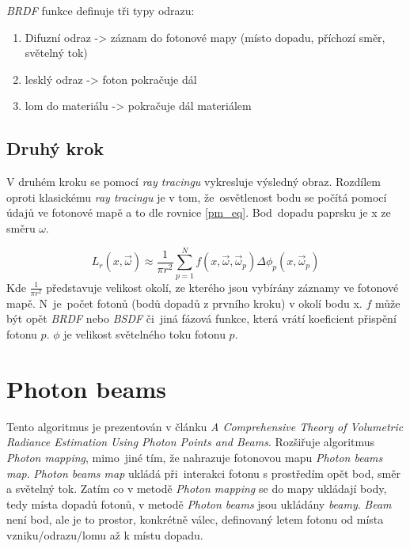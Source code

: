\textit{BRDF} funkce definuje tři typy odrazu:
\begin{enumerate}
   \item Difuzní odraz -> záznam do fotonové mapy (místo dopadu, příchozí směr, světelný tok)
    \item lesklý odraz -> foton pokračuje dál
    \item lom do materiálu -> pokračuje dál materiálem
\end{enumerate}
 
 \subsection{Druhý krok}
V druhém kroku se pomocí \textit{ray tracingu} vykresluje výsledný obraz. Rozdílem oproti klasickému \textit{ray tracingu} je v tom, že~osvětlenost bodu se počítá pomocí údajů ve fotonové mapě a to dle rovnice \ref{pm_eq}. Bod~dopadu paprsku je x ze směru $\omega$.

\begin{equation}\label{pm_eq}
    L_r(x,\vec{\omega}) \approx \frac{1}{\pi r^2} \sum_{p=1}^{N}f(x,\vec{\omega},\vec{\omega}_p)\Delta\phi_p(x,\vec{\omega}_p)
\end{equation}
Kde $\frac{1}{\pi r^2}$ představuje velikost okolí, ze kterého jsou vybírány záznamy ve fotonové mapě. N~je~počet fotonů (bodů dopadů z prvního kroku) v okolí bodu x. $f$ může být opět \textit{BRDF} nebo \textit{BSDF} či~jiná fázová funkce, která vrátí koeficient přispění fotonu $p$. $\phi$ je velikost světelného toku fotonu $p$.
\section{Photon beams}
Tento algoritmus je prezentován v článku \textit{A Comprehensive Theory of Volumetric Radiance Estimation Using Photon Points and Beams}\cite{comprehensive}. Rozšiřuje algoritmus \textit{Photon mapping}, mimo~jiné tím, že nahrazuje fotonovou mapu \textit{Photon beams map}. \textit{Photon beams map} ukládá při~interakci fotonu s prostředím opět bod, směr a světelný tok. Zatím co v metodě \textit{Photon mapping} se do mapy ukládají body, tedy místa dopadů fotonů, v metodě \textit{Photon beams} jsou ukládány \textit{beamy}. \textit{Beam} není bod, ale je to prostor, konkrétně válec, definovaný letem fotonu od místa vzniku/odrazu/lomu až k místu dopadu.

